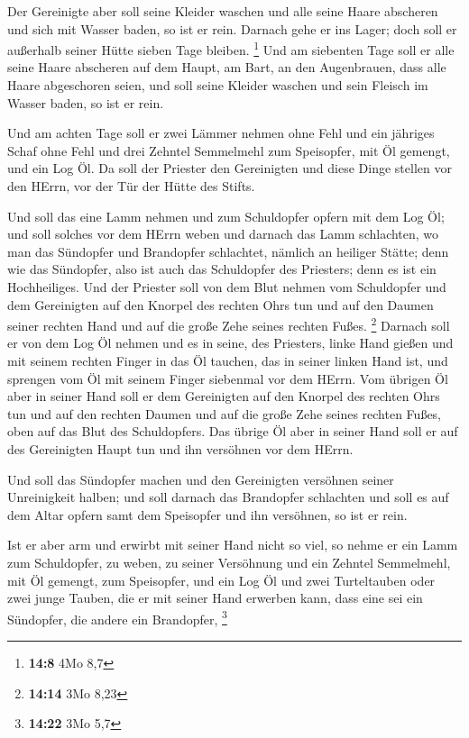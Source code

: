 Der Gereinigte aber soll seine Kleider waschen und alle
seine Haare abscheren und sich mit Wasser baden, so ist er rein. Darnach
gehe er ins Lager; doch soll er außerhalb seiner Hütte sieben Tage
bleiben. \footnote{\textbf{14:8} 4Mo 8,7}  Und am siebenten
Tage soll er alle seine Haare abscheren auf dem Haupt, am Bart, an den
Augenbrauen, dass alle Haare abgeschoren seien, und soll seine Kleider
waschen und sein Fleisch im Wasser baden, so ist er rein.

 Und am achten Tage soll er zwei Lämmer nehmen ohne Fehl
und ein jähriges Schaf ohne Fehl und drei Zehntel Semmelmehl zum
Speisopfer, mit Öl gemengt, und ein Log Öl.  Da soll der
Priester den Gereinigten und diese Dinge stellen vor den HErrn, vor der
Tür der Hütte des Stifts.

 Und soll das eine Lamm nehmen und zum Schuldopfer opfern
mit dem Log Öl; und soll solches vor dem HErrn weben  und
darnach das Lamm schlachten, wo man das Sündopfer und Brandopfer
schlachtet, nämlich an heiliger Stätte; denn wie das Sündopfer, also ist
auch das Schuldopfer des Priesters; denn es ist ein Hochheiliges.
 Und der Priester soll von dem Blut nehmen vom Schuldopfer
und dem Gereinigten auf den Knorpel des rechten Ohrs tun und auf den
Daumen seiner rechten Hand und auf die große Zehe seines rechten Fußes.
\footnote{\textbf{14:14} 3Mo 8,23}  Darnach soll er von dem
Log Öl nehmen und es in seine, des Priesters, linke Hand gießen
 und mit seinem rechten Finger in das Öl tauchen, das in
seiner linken Hand ist, und sprengen vom Öl mit seinem Finger siebenmal
vor dem HErrn.  Vom übrigen Öl aber in seiner Hand soll er
dem Gereinigten auf den Knorpel des rechten Ohrs tun und auf den rechten
Daumen und auf die große Zehe seines rechten Fußes, oben auf das Blut
des Schuldopfers.  Das übrige Öl aber in seiner Hand soll
er auf des Gereinigten Haupt tun und ihn versöhnen vor dem HErrn.

 Und soll das Sündopfer machen und den Gereinigten
versöhnen seiner Unreinigkeit halben; und soll darnach das Brandopfer
schlachten  und soll es auf dem Altar opfern samt dem
Speisopfer und ihn versöhnen, so ist er rein.

 Ist er aber arm und erwirbt mit seiner Hand nicht so viel,
so nehme er ein Lamm zum Schuldopfer, zu weben, zu seiner Versöhnung und
ein Zehntel Semmelmehl, mit Öl gemengt, zum Speisopfer, und ein Log Öl
 und zwei Turteltauben oder zwei junge Tauben, die er mit
seiner Hand erwerben kann, dass eine sei ein Sündopfer, die andere ein
Brandopfer, \footnote{\textbf{14:22} 3Mo 5,7}

